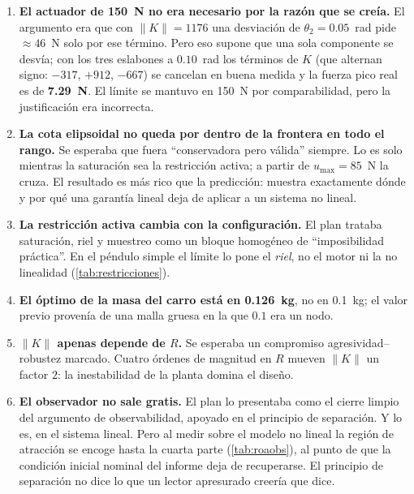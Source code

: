 \documentclass[11pt,letterpaper]{article}
\theoremstyle{definition}
\theoremstyle{plain}
\theoremstyle{remark}
\begin{document}
\begin{enumerate}
  \item \textbf{El actuador de 150~N no era necesario por la razón que se
  creía.} El argumento era que con $\|K\|=1176$ una desviación de
  $\theta_2=0.05$~rad pide $\approx46$~N solo por ese término. Pero eso supone
  que una sola componente se desvía; con los tres eslabones a $0.10$~rad los
  términos de $K$ (que alternan signo: $-317$, $+912$, $-667$) se cancelan en
  buena medida y la fuerza pico real es de \textbf{7.29~N}. El límite se mantuvo
  en 150~N por comparabilidad, pero la justificación era incorrecta.

  \item \textbf{La cota elipsoidal no queda por dentro de la frontera en todo el
  rango.} Se esperaba que fuera ``conservadora pero válida'' siempre. Lo es solo
  mientras la saturación sea la restricción activa; a partir de
  $u_{\max}=85$~N la cruza. El resultado es más rico que la predicción: muestra
  exactamente dónde y por qué una garantía lineal deja de aplicar a un sistema
  no lineal.

  \item \textbf{La restricción activa cambia con la configuración.} El plan
  trataba saturación, riel y muestreo como un bloque homogéneo de
  ``imposibilidad práctica''. En el péndulo simple el límite lo pone el
  \emph{riel}, no el motor ni la no linealidad (\cref{tab:restricciones}).

  \item \textbf{El óptimo de la masa del carro está en 0.126~kg}, no en 0.1~kg;
  el valor previo provenía de una malla gruesa en la que $0.1$ era un nodo.

  \item \textbf{$\|K\|$ apenas depende de $R$.} Se esperaba un compromiso
  agresividad--robustez marcado. Cuatro órdenes de magnitud en $R$ mueven
  $\|K\|$ un factor $2$: la inestabilidad de la planta domina el diseño.

  \item \textbf{El observador no sale gratis.} El plan lo presentaba como el
  cierre limpio del argumento de observabilidad, apoyado en el principio de
  separación. Y lo es, en el sistema lineal. Pero al medir sobre el modelo no
  lineal la región de atracción se encoge hasta la cuarta parte
  (\cref{tab:roaobs}), al punto de que la condición inicial nominal del informe
  deja de recuperarse. El principio de separación no dice lo que un lector
  apresurado creería que dice.
\end{enumerate}
\end{document}
